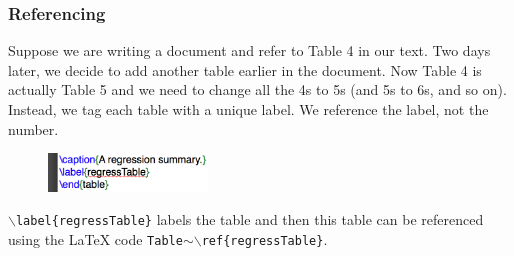 \documentclass[slidestop,compress,mathserif]{beamer}
\begin{document}
\begin{frame} \frametitle{Referencing}
Suppose we are writing a document and refer to Table 4 in our text. Two days later, we decide to add another table earlier in the document. Now Table 4 is actually Table 5 and we need to change all the 4s to 5s (and 5s to 6s, and so on).
\vspace{5mm} \\
Instead, we tag each table with a unique label. We reference the label, not the number.
\begin{figure}[htbp]
   \centering
   \includegraphics[height=0.4in]{basicsOfLatex/tabTable/labelTable}
\end{figure}
\texttt{\color{command}$\backslash$label}\texttt{\color{braces}\{}\texttt{regressTable}\texttt{\color{braces}\}} labels the table and then this table can be referenced using the LaTeX code \texttt{Table$\sim$}\texttt{\color{command}$\backslash$ref}\texttt{\color{braces}\{}\texttt{regressTable}\texttt{\color{braces}\}}.
\end{frame}
\end{document}
